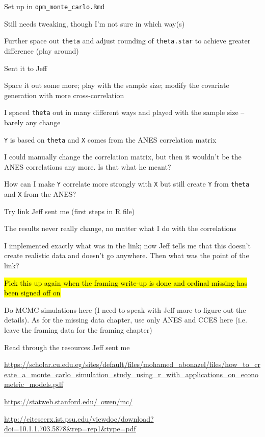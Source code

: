 \begin{coi}
\begin{coi}
				\item Set up in \texttt{opm\_monte\_carlo.Rmd}
				\item Still needs tweaking, though I'm not sure in which way(s)
				\item Further space out \texttt{theta} and adjust rounding of \texttt{theta.star} to achieve greater difference (play around)
				\item Sent it to Jeff
				\item Space it out some more; play with the sample size; modify the covariate generation with more cross-correlation
					\begin{coi}
						\item I spaced \texttt{theta} out in many different ways and played with the sample size -- barely any change
						\item \texttt{Y} is based on \texttt{theta} and \texttt{X} comes from the ANES correlation matrix
						\item I could manually change the correlation matrix, but then it wouldn't be the ANES correlations any more. Is that what he meant?
						\item How can I make \texttt{Y} correlate more strongly with \texttt{X} but still create \texttt{Y} from \texttt{theta} and \texttt{X} from the ANES?
						\item Try link Jeff sent me (first steps in R file)
						\item The results never really change, no matter what I do with the correlations
						\item I implemented exactly what was in the link; now Jeff tells me that this doesn't create realistic data and doesn't go anywhere. Then what was the point of the link?
					\end{coi}
				\item \hl{Pick this up again when the framing write-up is done and ordinal missing has been signed off on}
				\item Do MCMC simulations here (I need to speak with Jeff more to figure out the details). As for the missing data chapter, use only ANES and CCES here (i.e. leave the framing data for the framing chapter)
				\item Read through the resources Jeff sent me
					\begin{coi}
						\item \href{https://scholar.cu.edu.eg/sites/default/files/mohamed_abonazel/files/how_to_create_a_monte_carlo_simulation_study_using_r_with_applications_on_econometric_models.pdf}{https://scholar.cu.edu.eg/sites/default/files/mohamed\_abonazel/files/how\_to\_create\_a\_monte\_carlo\_simulation\_study\_using\_r\_with\_applications\_on\_econometric\_models.pdf}
						\item \href{https://statweb.stanford.edu/~owen/mc/}{https://statweb.stanford.edu/~owen/mc/}
						\item \href{http://citeseerx.ist.psu.edu/viewdoc/download?doi=10.1.1.703.5878&rep=rep1&type=pdf}{http://citeseerx.ist.psu.edu/viewdoc/download?doi=10.1.1.703.5878\&rep=rep1\&type=pdf}
					\end{coi}
			\end{coi}
	\end{coi}
	
